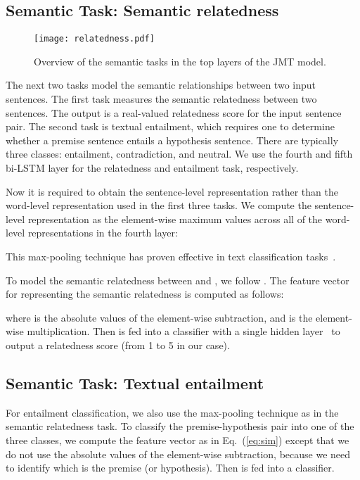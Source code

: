 \documentclass[11pt,a4paper]{article}
\begin{document}
\subsection{Semantic Task: Semantic relatedness}

\begin{figure}[t]
	\begin{center}
    	\texttt{[image: relatedness.pdf]}
    \end{center}
\label{fig6}
\caption{Overview of the semantic tasks in the top layers of the JMT model.}
\end{figure}
\fi

The next two tasks model the semantic relationships between two input sentences. 
The first task measures the semantic relatedness between two sentences.
The output is a real-valued relatedness score for the input sentence pair.
The second task is textual entailment, which requires one to determine whether a premise sentence entails a hypothesis sentence.
There are typically three classes: entailment, contradiction, and neutral.
We use the fourth and fifth bi-LSTM layer for the relatedness  and entailment task, respectively.

Now it is required to obtain the sentence-level representation rather than the word-level representation  used in the first three tasks.
We compute the sentence-level representation  as the element-wise maximum values across all of the word-level representations in the fourth layer:

This max-pooling technique has proven effective in text classification tasks~\citep{lai2015maxpooling}.

To model the semantic relatedness between  and , we follow \citet{tai2015treelstm}. The feature vector for representing the semantic relatedness is computed as follows:

where  is the absolute values of the element-wise subtraction, and  is the element-wise multiplication.
Then  is fed into a  classifier with a single  hidden layer~\citep{goodfellow2013} to output a relatedness score (from 1 to 5 in our case).

\subsection{Semantic Task: Textual entailment}
For entailment classification, we also use the max-pooling technique as in the semantic relatedness task.
To classify the premise-hypothesis pair  into one of the three classes, we compute the feature vector  as in Eq.~(\ref{eq:sim}) except that we do not use the absolute values of the element-wise subtraction, because we need to identify which is the premise (or hypothesis).
Then  is fed into a  classifier.
\end{document}
